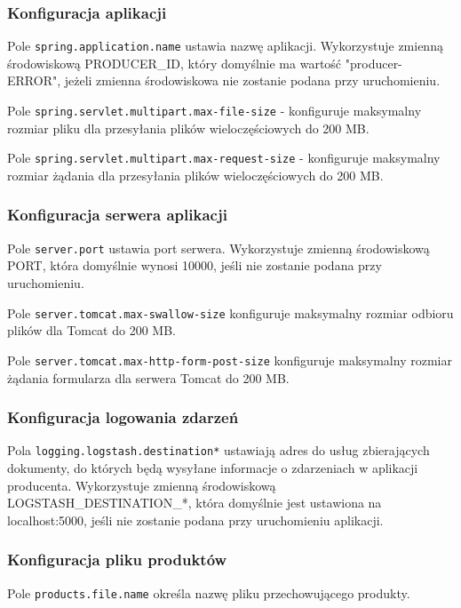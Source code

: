 \subsubsection{Konfiguracja aplikacji}

Pole \verb|spring.application.name| ustawia nazwę aplikacji. Wykorzystuje zmienną środowiskową PRODUCER\_ID, który domyślnie ma wartość "producer-ERROR", jeżeli zmienna środowiskowa nie zostanie podana przy uruchomieniu.

Pole \verb|spring.servlet.multipart.max-file-size| - konfiguruje maksymalny rozmiar pliku dla przesyłania plików wieloczęściowych do 200 MB.

Pole \verb|spring.servlet.multipart.max-request-size| - konfiguruje maksymalny rozmiar żądania dla przesyłania plików wieloczęściowych do 200 MB.

\subsubsection{Konfiguracja serwera aplikacji}

Pole \verb|server.port| ustawia port serwera. Wykorzystuje zmienną środowiskową PORT, która domyślnie wynosi 10000, jeśli nie zostanie podana przy uruchomieniu.

Pole \verb|server.tomcat.max-swallow-size| konfiguruje maksymalny rozmiar odbioru plików dla Tomcat do 200 MB.

Pole \verb|server.tomcat.max-http-form-post-size| konfiguruje maksymalny rozmiar żądania  formularza  dla serwera Tomcat do 200 MB.

\subsubsection{Konfiguracja logowania zdarzeń}

Pola \verb|logging.logstash.destination*| ustawiają adres do usług zbierających dokumenty, do których będą wysyłane informacje o zdarzeniach w aplikacji producenta. Wykorzystuje zmienną środowiskową LOGSTASH\_DESTINATION\_*, która domyślnie jest ustawiona na localhost:5000, jeśli nie zostanie podana przy uruchomieniu aplikacji.

\subsubsection{Konfiguracja pliku produktów}

Pole \verb|products.file.name| określa nazwę pliku przechowującego produkty.

